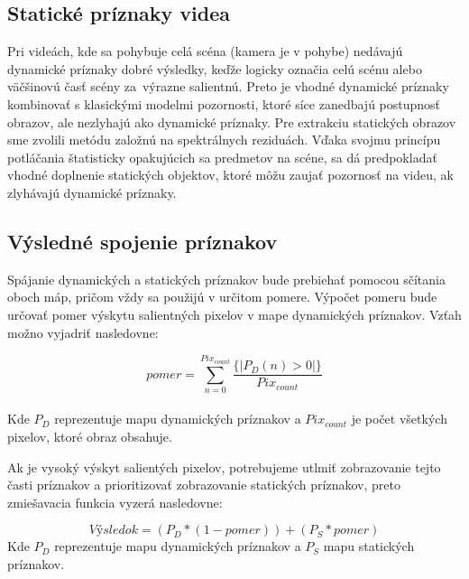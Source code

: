 \subsection{Statické príznaky videa}
Pri videách, kde sa pohybuje celá scéna (kamera je v pohybe) nedávajú dynamické príznaky dobré výsledky, keďže logicky označia celú scénu alebo väčšinovú časť scény za~výrazne salientnú.
Preto je vhodné dynamické príznaky kombinovať s klasickými modelmi pozornosti, ktoré síce zanedbajú postupnosť obrazov, ale nezlyhajú ako dynamické príznaky.
Pre extrakciu statických obrazov sme zvolili metódu založnú na spektrálnych reziduách\cite{spectral-rezidual}.
Vďaka svojmu princípu potláčania štatisticky opakujúcich sa predmetov na scéne, sa dá predpokladať vhodné doplnenie statických objektov, ktoré môžu zaujať pozornosť na videu, ak zlyhávajú dynamické príznaky.

\subsection{Výsledné spojenie príznakov}
Spájanie dynamických a statických príznakov bude prebiehať pomocou sčítania oboch máp, pričom vždy sa použijú v určitom pomere.
Výpočet pomeru bude určovať pomer výskytu salientných pixelov v mape dynamických príznakov.
Vzťah možno vyjadriť nasledovne:

\begin{equation}
  pomer = \sum_{n=0}^{Pix_{count}} \frac{\{\left|P_D(n) > 0\right|\}}{Pix_{count}} 
\end{equation}
\\
Kde \begin{math}P_D\end{math} reprezentuje mapu dynamických príznakov a \begin{math}Pix_{count}\end{math} je počet všetkých pixelov, ktoré obraz obsahuje.

Ak je vysoký výskyt salientých pixelov, potrebujeme utlmiť zobrazovanie tejto časti príznakov a prioritizovať zobrazovanie statických príznakov, preto zmiešavacia funkcia vyzerá nasledovne:

\begin{equation}
  Výsledok = (P_D * (1-pomer)) + (P_S * pomer)
\end{equation}
Kde \begin{math}P_D\end{math} reprezentuje mapu dynamických príznakov a \begin{math}P_S\end{math} mapu statických príznakov.


